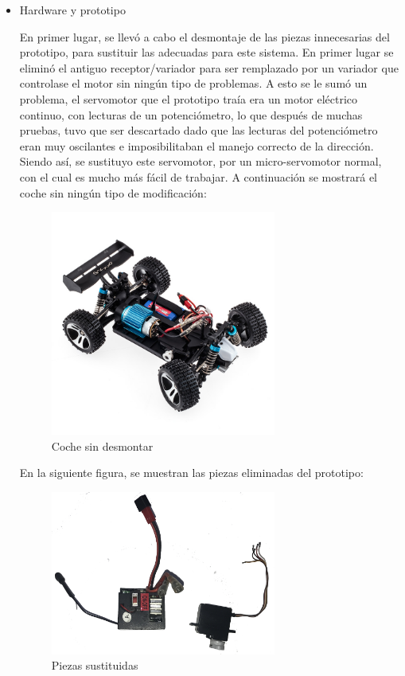 \documentclass{pclass}
\begin{document}
\begin{itemize}

\item Hardware y prototipo

En primer lugar, se llevó a cabo el desmontaje de las piezas innecesarias del prototipo, para sustituir las adecuadas para este sistema. En primer lugar se eliminó el antiguo receptor/variador para ser remplazado por un variador que controlase el motor sin ningún tipo de problemas. A esto se le sumó un problema, el servomotor que el prototipo traía era un motor eléctrico continuo, con lecturas de un potenciómetro, lo que después de muchas pruebas, tuvo que ser descartado dado que las lecturas del potenciómetro eran muy oscilantes e imposibilitaban el manejo correcto de la dirección. Siendo así, se sustituyo este servomotor, por un micro-servomotor normal, con el cual es mucho más fácil de trabajar.
A continuación se mostrará el coche sin ningún tipo de modificación:

\begin{figure}[H]
  \centering
    \includegraphics[width=0.7\textwidth]{img/A959}
  \caption{Coche sin desmontar}
  \label{fig:CocheSin}
\end{figure}

En la siguiente figura, se muestran las piezas eliminadas del prototipo:

\begin{figure}[H]
  \centering
    \includegraphics[width=0.7\textwidth]{img/piezasSustituidas}
  \caption{Piezas sustituidas}
  \label{fig:PiezasSusti}
\end{figure}


\end{itemize}
\end{document}
